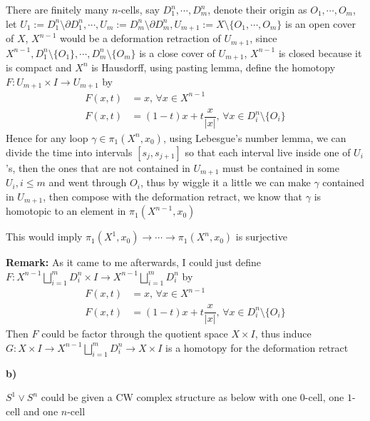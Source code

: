 \documentclass[12pt]{article}
\begin{document}
There are finitely many $n$-cells, say $D^{n}_{1},\cdots,D^{n}_{m}$, denote their origin as $O_{1},\cdots,O_{m}$, let $U_{1}:=D^{n}_{1}\setminus\partial D^{n}_{1},\cdots,U_{m}:=D^{n}_{m}\setminus\partial D^{n}_{m},U_{m+1}:=X\setminus \{O_{1},\cdots,O_{m}\}$ is an open cover of $X$, $X^{n-1}$ would be a deformation retraction of $U_{m+1}$, since $X^{n-1},D^{n}_{1}\setminus\{O_{1}\},\cdots,D^{n}_{m}\setminus\{O_{m}\}$ is a close cover of $U_{m+1}$, $X^{n-1}$ is closed because it is compact and $X^{n}$ is Hausdorff, using pasting lemma, define the homotopy $F: U_{m+1}\times I\rightarrow U_{m+1}$ by
\[
\begin{aligned}
F(x,t)&=x, \,\forall x\in X^{n-1} \\
F(x,t)&=(1-t)x+t\dfrac{x}{|x|}, \,\forall x\in D^{n}_{i}\setminus\{O_{i}\}
\end{aligned}
\]
Hence for any loop $\gamma\in\pi_{1}(X^{n},x_{0})$, using Lebesgue's number lemma, we can divide the time into intervals $[s_{j},s_{j+1}]$ so that each interval live inside one of $U_{i}$'s, then the ones that are not contained in $U_{m+1}$ must be contained in some $U_{i}, i\leq m$ and went through $O_{i}$, thus by wiggle it a little we can make $\gamma$ contained in $U_{m+1}$, then compose with the deformation retract, we know that $\gamma$ is homotopic to an element in $\pi_{1}(X^{n-1},x_{0})$ \par
This would imply $\pi_{1}(X^{1},x_{0})\rightarrow\cdots\rightarrow\pi_{1}(X^{n},x_{0})$ is surjective \par
\textbf{Remark:} As it came to me afterwards, I could just define $F: X^{n-1}\bigsqcup_{i=1}^{m}D_{i}^{n}\times I\rightarrow X^{n-1}\bigsqcup_{i=1}^{m}D_{i}^{n}$ by 
\[
\begin{aligned}
F(x,t)&=x, \,\forall x\in X^{n-1} \\
F(x,t)&=(1-t)x+t\dfrac{x}{|x|}, \,\forall x\in D^{n}_{i}\setminus\{O_{i}\}
\end{aligned}
\]
Then $F$ could be factor through the quotient space $X\times I$, thus induce $G: X\times I\rightarrow X^{n-1}\bigsqcup_{i=1}^{m}D_{i}^{n}\rightarrow X\times I$ is a homotopy for the deformation retract \par
\textbf{b)} \par
$S^{1}\vee S^{n}$ could be given a CW complex structure as below with one $0$-cell, one $1$-cell and one $n$-cell
\begin{center}
\end{center}
\end{document}
